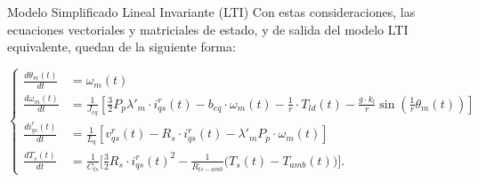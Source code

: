 \documentclass[12pt]{beamer}
\begin{document}
\begin{frame}{Modelo Simplificado Lineal Invariante (LTI)}\scriptsize
Con estas consideraciones, las ecuaciones vectoriales y matriciales de estado, y de salida del modelo LTI equivalente, quedan de la siguiente forma:

\begin{equation}
\left\{
\begin{aligned}
\frac{d\theta_m(t)}{dt} &= \omega_m(t) \\[1ex]
\frac{d\omega_m(t)}{dt} &= \frac{1}{J_{eq}}\left[\frac{3}{2}P_p\lambda'_m\cdot i^r_{qs}(t) - b_{eq}\cdot\omega_m(t) - \frac{1}{r}\cdot T_{ld}(t) - \frac{g \cdot k_l}{r}\sin(\frac{1}{r}\theta_m(t))\right] \\[1ex]
\frac{di^r_{qs}(t)}{dt} &= \frac{1}{L_q}\left[v^r_{qs}(t) - R_s\cdot i^r_{qs}(t) - \lambda'_mP_p\cdot\omega_m(t)\right] \\
\frac{d T_s(t)}{dt} &= \frac{1}{C_{ts}} \Bigg[ \frac{3}{2} R_s \cdot i_{qs}^r(t)^2 - \frac{1}{R_{ts-amb}} \big( T_s(t) - T_{amb}(t) \big) \Bigg].
\end{aligned}
\right.
\label{eq:sistema_LTI_equivalente}
\end{equation}


\end{frame}
\end{document}
